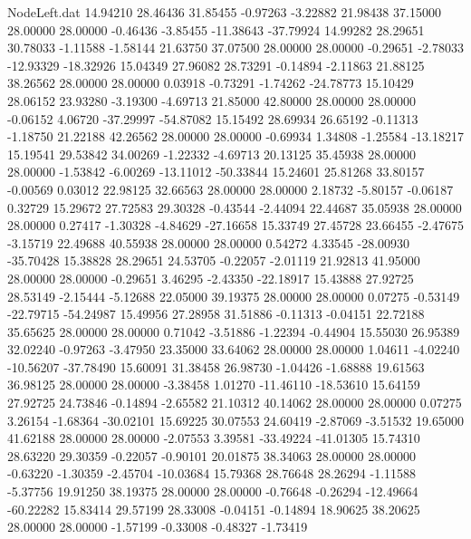 \begin{filecontents}{NodeLeft.dat}
  14.94210   28.46436   31.85455    -0.97263   -3.22882   21.98438   37.15000   28.00000   28.00000   -0.46436   -3.85455  -11.38643  -37.79924
  14.99282   28.29651   30.78033    -1.11588   -1.58144   21.63750   37.07500   28.00000   28.00000   -0.29651   -2.78033  -12.93329  -18.32926
  15.04349   27.96082   28.73291    -0.14894   -2.11863   21.88125   38.26562   28.00000   28.00000    0.03918   -0.73291   -1.74262  -24.78773
  15.10429   28.06152   23.93280    -3.19300   -4.69713   21.85000   42.80000   28.00000   28.00000   -0.06152    4.06720  -37.29997  -54.87082
  15.15492   28.69934   26.65192    -0.11313   -1.18750   21.22188   42.26562   28.00000   28.00000   -0.69934    1.34808   -1.25584  -13.18217
  15.19541   29.53842   34.00269    -1.22332   -4.69713   20.13125   35.45938   28.00000   28.00000   -1.53842   -6.00269  -13.11012  -50.33844
  15.24601   25.81268   33.80157    -0.00569    0.03012   22.98125   32.66563   28.00000   28.00000    2.18732   -5.80157   -0.06187    0.32729
  15.29672   27.72583   29.30328    -0.43544   -2.44094   22.44687   35.05938   28.00000   28.00000    0.27417   -1.30328   -4.84629  -27.16658
  15.33749   27.45728   23.66455    -2.47675   -3.15719   22.49688   40.55938   28.00000   28.00000    0.54272    4.33545  -28.00930  -35.70428
  15.38828   28.29651   24.53705    -0.22057   -2.01119   21.92813   41.95000   28.00000   28.00000   -0.29651    3.46295   -2.43350  -22.18917
  15.43888   27.92725   28.53149    -2.15444   -5.12688   22.05000   39.19375   28.00000   28.00000    0.07275   -0.53149  -22.79715  -54.24987
  15.49956   27.28958   31.51886    -0.11313   -0.04151   22.72188   35.65625   28.00000   28.00000    0.71042   -3.51886   -1.22394   -0.44904
  15.55030   26.95389   32.02240    -0.97263   -3.47950   23.35000   33.64062   28.00000   28.00000    1.04611   -4.02240  -10.56207  -37.78490
  15.60091   31.38458   26.98730    -1.04426   -1.68888   19.61563   36.98125   28.00000   28.00000   -3.38458    1.01270  -11.46110  -18.53610
  15.64159   27.92725   24.73846    -0.14894   -2.65582   21.10312   40.14062   28.00000   28.00000    0.07275    3.26154   -1.68364  -30.02101
  15.69225   30.07553   24.60419    -2.87069   -3.51532   19.65000   41.62188   28.00000   28.00000   -2.07553    3.39581  -33.49224  -41.01305
  15.74310   28.63220   29.30359    -0.22057   -0.90101   20.01875   38.34063   28.00000   28.00000   -0.63220   -1.30359   -2.45704  -10.03684
  15.79368   28.76648   28.26294    -1.11588   -5.37756   19.91250   38.19375   28.00000   28.00000   -0.76648   -0.26294  -12.49664  -60.22282
  15.83414   29.57199   28.33008    -0.04151   -0.14894   18.90625   38.20625   28.00000   28.00000   -1.57199   -0.33008   -0.48327   -1.73419

\end{filecontents}
